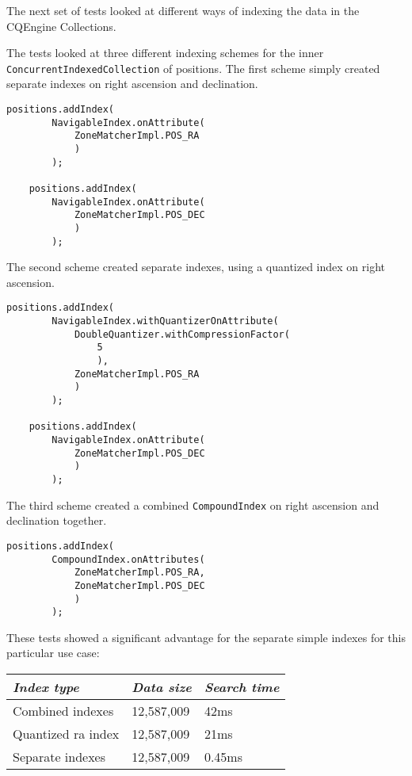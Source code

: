 \documentclass{article}
\newcommand{\cqengine} {CQEngine\xspace}
\begin{document}
The next set of tests looked at different ways of indexing the data in the \cqengine Collections.

The tests looked at three different indexing schemes for the inner \texttt{ConcurrentIndexedCollection} of positions. The first scheme simply created separate indexes on right ascension and declination.

\begin{lstlisting}[style=Java]
    positions.addIndex(
        NavigableIndex.onAttribute(
            ZoneMatcherImpl.POS_RA
            )
        );

    positions.addIndex(
        NavigableIndex.onAttribute(
            ZoneMatcherImpl.POS_DEC
            )
        );
\end{lstlisting}

The second scheme created separate indexes, using a quantized index on right ascension.

\begin{lstlisting}[style=Java]
    positions.addIndex(
        NavigableIndex.withQuantizerOnAttribute(
            DoubleQuantizer.withCompressionFactor(
                5
                ),
            ZoneMatcherImpl.POS_RA
            )
        );

    positions.addIndex(
        NavigableIndex.onAttribute(
            ZoneMatcherImpl.POS_DEC
            )
        );
\end{lstlisting}

The third scheme created a combined \texttt{CompoundIndex} on right ascension and declination together.

\begin{lstlisting}[style=Java]
    positions.addIndex(
        CompoundIndex.onAttributes(
            ZoneMatcherImpl.POS_RA,
            ZoneMatcherImpl.POS_DEC
            )
        );
\end{lstlisting}

These tests showed a significant advantage for the separate simple indexes for this particular use case:

\begin{table}[h]
\centering
\begin{tabular}{|l|l|l|}
\hline
\textit{Index type} & \textit{Data size} & \textit{Search time} \\ \hline
Combined indexes & 12,587,009 & 42ms \\ \hline
Quantized ra index & 12,587,009 & 21ms \\ \hline
Separate indexes & 12,587,009 & 0.45ms \\ \hline
\end{tabular}
\end{table}
\end{document}
